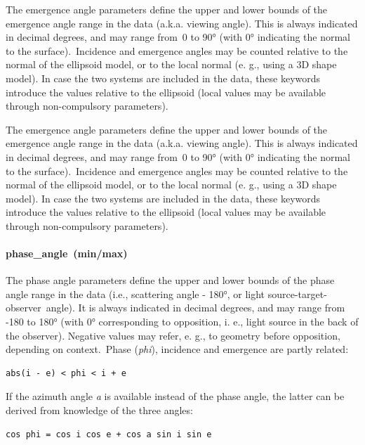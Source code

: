 \documentclass[11pt,a4paper]{ivoa}
\begin{document}
The emergence angle parameters define the upper and lower bounds of the emergence angle range in the data (a.k.a. viewing angle). This is always indicated in decimal degrees, and may range from 0 to 90° (with 0° indicating the normal to the surface). Incidence and emergence angles may be counted relative to the normal of the ellipsoid model, or to the local normal (e. g., using a 3D shape model). In case the two systems are included in the data, these keywords introduce the values relative to the ellipsoid (local values may be available through non-compulsory parameters).

The emergence angle parameters define the upper and lower bounds of the emergence angle range in the data (a.k.a. viewing angle). This is always indicated in decimal degrees, and may range from 0 to 90° (with 0° indicating the normal to the surface). Incidence and emergence angles may be counted relative to the normal of the ellipsoid model, or to the local normal (e. g., using a 3D shape model). In case the two systems are included in the data, these keywords introduce the values relative to the ellipsoid (local values may be available through non-compulsory parameters).

\paragraph{phase\_angle (min/max)}

The phase angle parameters define the upper and lower bounds of the phase angle range in the data (i.e., scattering angle - 180°, or light source-target-observer angle). It is always indicated in decimal degrees, and may range from -180 to 180° (with 0° corresponding to opposition, i. e., light source in the back of the observer). Negative values may refer, e. g., to geometry before opposition, depending on context. Phase (\emph{phi}), incidence and emergence are partly related:






\begin{verbatim}
abs(i - e) < phi < i + e
\end{verbatim}




If the azimuth angle \emph{a} is available instead of the phase angle, the latter can be derived from knowledge of the three angles:






\begin{verbatim}
cos phi = cos i cos e + cos a sin i sin e
\end{verbatim}
\end{document}
